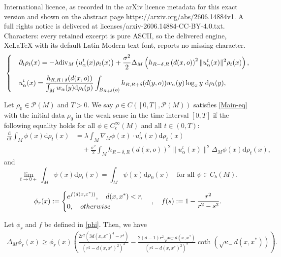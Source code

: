 \documentclass[10pt,a4paper]{amsart}
\def\d{\mathrm{d}}
\newcommand{\dist}{d}%
\newcommand{\dm}{d} %
\newcommand{\p}{o}%
\begin{document}
International licence, as recorded in the arXiv licence metadata for this exact version and shown on the abstract page https://arxiv.org/abs/2606.14884v1. A full rights notice is delivered at licenses/arxiv-2606.14884-CC-BY-4.0.txt. Characters: every retained excerpt is pure ASCII, so the delivered engine, XeLaTeX with its default Latin Modern text font, reports no missing character.
\begin{align}\label{Main-eq}
\begin{cases}
&\displaystyle\partial_t\rho_t(x)=-\lambda\mathrm{div}_M\left(u_\alpha^t(x)\rho_t(x)\right)+\frac{\sigma^2}{2}\Delta_M\left(h_{R-\delta, R}\left(\dist(x, \p)\right)^2\|u_\alpha^t(x)\|^2\rho_t(x)\right),\vspace{0.3cm}\\
&\displaystyle  u_\alpha^t(x)=\frac{h_{R, R+\delta}(\dist(x, \p))}{\int_{M}w_\alpha(y)\d \rho_t(y)}\int_{B_{R+\delta}(\p)}h_{R, R+\delta}(\dist(y, \p))w_\alpha(y)\log_xy~\d \rho_t(y),
\end{cases}
\end{align}

\begin{definition} \label{def:weaksol}
Let $\rho_0\in\mathcal{P}(M)$ and $T>0$. We say $\rho\in C([0, T],\mathcal{P}(M))$ satisfies \eqref{Main-eq} with the initial data $\rho_0$ in the weak sense in the time interval $[0, T]$ if the following equality holds for all $\phi\in {C}_c^\infty(M)$ and all $t\in (0, T)$:
\begin{align*}
\frac{\d}{\d t}\int_M \phi(x)\d\rho_t(x)&=\lambda\int_{M} \nabla_M\phi(x)\cdot u_\alpha^t(x)\d\rho_t(x) \\
&\quad +\frac{\sigma^2}{2}\int_M h_{R-\delta,R}(\dist(x, \p))^2\|u_\alpha^t(x)\|^2\Delta_M\phi(x)\d\rho_t(x),
\end{align*}
and \[
\lim_{t\to 0+}\int_M \psi(x)\d\rho_t(x)=\int_M \psi(x)\d\rho_0(x)
\quad \text{for all } \psi\in C_b(M).
\]
\end{definition}

\begin{equation} \label{phi}
\phi_r(x) :=
\begin{cases}
\displaystyle e^{f(d(x,x^*))},\quad d(x,x^*)<r, \\
0,\quad \textup{otherwise}
\end{cases}, \quad f(s) := 1-\frac{r^2}{r^2 - s^2}.
\end{equation}

\begin{lemma} \label{lem:lower}
Let $\phi_r$ and $f$ be defined in \eqref{phi}. Then, we have
\begin{align*}
\Delta_M \phi_r(x)\geq\phi_r(x)\left(\frac{2r^2(3\dist(x, x^*)^4-r^4)}{(r^2-\dist(x, x^*)^2)^4}-\frac{2(\dm-1)r^2\sqrt{\kappa_-}\dist(x, x^*)}{(r^2-\dist(x, x^*)^2)^2}
\coth\left(\sqrt{\kappa_-}\dist(x, x^*)\right)\right).
\end{align*}
\end{lemma}
\end{document}
